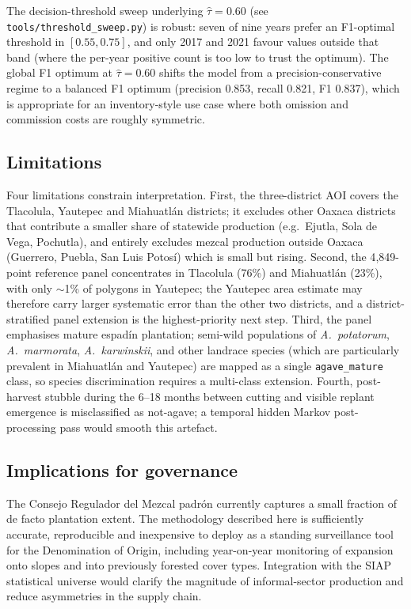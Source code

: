 \documentclass[10pt,a4paper]{article}
\begin{document}
The decision-threshold sweep underlying $\hat{\tau} = 0.60$ (see
\texttt{tools/threshold\_sweep.py}) is robust: seven of nine years
prefer an F1-optimal threshold in $[0.55, 0.75]$, and only 2017 and
2021 favour values outside that band (where the per-year positive
count is too low to trust the optimum). The global F1 optimum at
$\hat{\tau} = 0.60$ shifts the model from a precision-conservative
regime to a balanced F1 optimum (precision 0.853, recall 0.821, F1
0.837), which is appropriate for an inventory-style use case where
both omission and commission costs are roughly symmetric.

\subsection{Limitations}\label{sec:limitations}

Four limitations constrain interpretation. First, the
three-district AOI covers the Tlacolula, Yautepec and Miahuatlán
districts; it excludes other Oaxaca districts that contribute a
smaller share of statewide production (e.g.\ Ejutla, Sola de Vega,
Pochutla), and entirely excludes mezcal production outside Oaxaca
(Guerrero, Puebla, San Luis Potos\'i) which is small but rising.
Second, the 4{,}849-point reference panel concentrates in
Tlacolula (76\%) and Miahuatlán (23\%), with only $\sim$1\% of
polygons in Yautepec; the Yautepec area estimate may therefore
carry larger systematic error than the other two districts, and a
district-stratified panel extension is the highest-priority
next step. Third, the panel emphasises mature espad\'in
plantation; semi-wild populations of \textit{A.\ potatorum},
\textit{A.\ marmorata}, \textit{A.\ karwinskii}, and other
landrace species (which are particularly prevalent in Miahuatlán
and Yautepec) are mapped as a single \texttt{agave\_mature}
class, so species discrimination requires a multi-class extension.
Fourth, post-harvest stubble during the 6--18 months between
cutting and visible replant emergence is misclassified as
not-agave; a temporal hidden Markov post-processing pass would
smooth this artefact.

\subsection{Implications for governance}

The Consejo Regulador del Mezcal padr\'on currently captures a small
fraction of de facto plantation extent. The methodology described here
is sufficiently accurate, reproducible and inexpensive to deploy as a
standing surveillance tool for the Denomination of Origin, including
year-on-year monitoring of expansion onto slopes and into previously
forested cover types. Integration with the SIAP statistical universe
would clarify the magnitude of informal-sector production and reduce
asymmetries in the supply chain.
\end{document}
